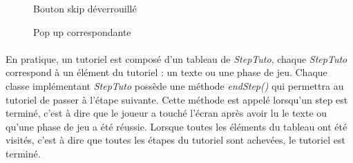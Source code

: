 \begin{figure}[H]
 \begin{minipage}{0.49\textwidth}\centering
     \caption{Bouton skip déverrouillé}
     \label{skip_unlocked}
   \end{minipage}
   \begin {minipage}{0.49\textwidth}\centering
     \caption{Pop up correspondante}
     \label{skip_unlocked_popup}
   \end{minipage}
\end{figure}

\paragraph{}
En pratique, un tutoriel est composé d'un tableau de \textit{StepTuto}, chaque \textit{StepTuto} correspond à un élément du tutoriel : un texte ou une phase de jeu. Chaque classe implémentant \textit{StepTuto} possède une méthode \textit{endStep()} qui permettra au tutoriel de passer à l'étape suivante. Cette méthode est appelé lorsqu'un step est terminé, c'est à dire que le joueur a touché l'écran après avoir lu le texte ou qu'une phase de jeu a été réussie. Lorsque toutes les éléments du tableau ont été visités, c'est à dire que toutes les étapes du tutoriel sont achevées, le tutoriel est terminé.

